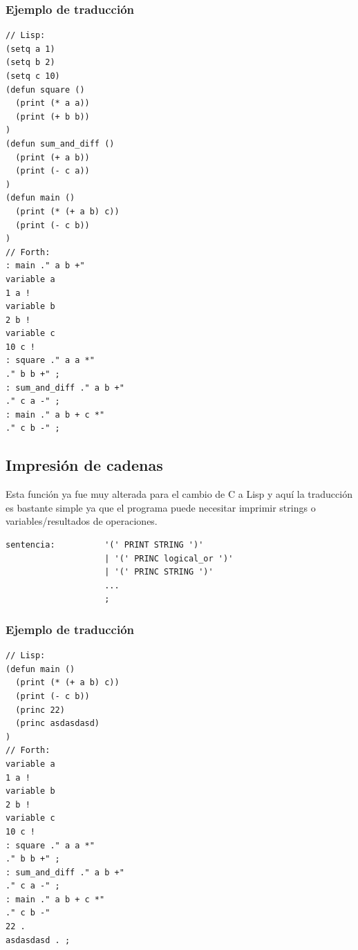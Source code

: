 \documentclass[12pt,a4paper]{article}
\begin{document}
\subsubsection{Ejemplo de traducción}
\begin{lstlisting}
// Lisp:
(setq a 1)
(setq b 2)
(setq c 10)
(defun square ()
  (print (* a a))            
  (print (+ b b))            
)
(defun sum_and_diff ()
  (print (+ a b))            
  (print (- c a))            
)
(defun main ()
  (print (* (+ a b) c))   
  (print (- c b))           
)
// Forth:
: main ." a b +"
variable a
1 a !
variable b
2 b !
variable c
10 c !
: square ." a a *"
." b b +" ;
: sum_and_diff ." a b +"
." c a -" ;
: main ." a b + c *"
." c b -" ;
\end{lstlisting}
\subsection{Impresión de cadenas}
\noindent Esta función ya fue muy alterada para el cambio de C a Lisp y aquí la traducción es 
bastante simple ya que el programa puede necesitar imprimir strings o variables/resultados de 
operaciones. 
\begin{lstlisting}
sentencia:          '(' PRINT STRING ')'            
                    | '(' PRINC logical_or ')'          
                    | '(' PRINC STRING ')' 
                    ...
                    ;
\end{lstlisting}
\subsubsection{Ejemplo de traducción}
\begin{lstlisting}
// Lisp:
(defun main ()
  (print (* (+ a b) c))   
  (print (- c b))
  (princ 22)
  (princ asdasdasd)
)
// Forth:
variable a
1 a !
variable b
2 b !
variable c
10 c !
: square ." a a *"
." b b +" ;
: sum_and_diff ." a b +"
." c a -" ;
: main ." a b + c *"
." c b -"
22 .
asdasdasd . ;
\end{lstlisting}
\end{document}
